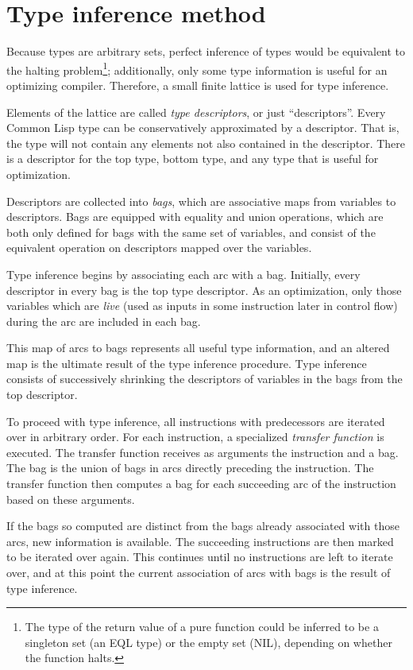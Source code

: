 \section{Type inference method}

Because \commonlisp{} types are arbitrary sets, perfect inference of
\commonlisp{} types would be equivalent to the halting
problem\footnote{The type of the return value of a pure function
  could be inferred to be a singleton set (an EQL type) or the
  empty set (NIL), depending on whether the function halts.};
additionally, only some type information is useful for an
optimizing compiler. Therefore, a small finite lattice is used for
type inference.

Elements of the lattice are called \textit{type descriptors}, or just
``descriptors''. Every Common Lisp type can be conservatively
approximated by a descriptor. That is, the type will not contain any
elements not also contained in the descriptor. There is a descriptor
for the top type, bottom type, and any type that is useful for
optimization.

Descriptors are collected into \textit{bags}, which are associative
maps from variables to descriptors. Bags are equipped with equality
and union operations, which are both only defined for bags with the
same set of variables, and consist of the equivalent operation on
descriptors mapped over the variables.

Type inference begins by associating each arc with a bag. Initially,
every descriptor in every bag is the top type descriptor. As an
optimization, only those variables which are \textit{live} (used as
inputs in some instruction later in control flow) during the arc are
included in each bag.

This map of arcs to bags represents all useful type information, and
an altered map is the ultimate result of the type inference
procedure. Type inference consists of successively shrinking the
descriptors of variables in the bags from the top descriptor.

To proceed with type inference, all instructions with predecessors are
iterated over in arbitrary order. For each instruction, a specialized
\textit{transfer function} is executed. The transfer function receives
as arguments the instruction and a bag. The bag is the union of bags
in arcs directly preceding the instruction. The transfer function then
computes a bag for each succeeding arc of the instruction based on
these arguments.

If the bags so computed are distinct from the bags already associated
with those arcs, new information is available. The succeeding
instructions are then marked to be iterated over again. This continues
until no instructions are left to iterate over, and at this point the
current association of arcs with bags is the result of type inference.

